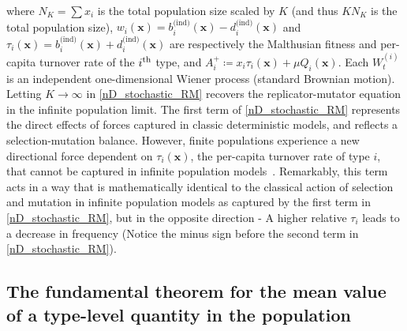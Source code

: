 where $N_K = \sum x_i$ is the total population size scaled by $K$ (and thus $KN_K$ is the total population size), $w_i(\mathbf{x}) = b^{\textrm{(ind)}}_{i}(\mathbf{x}) - d^{\textrm{(ind)}}_{i}(\mathbf{x})$ and $\tau_i(\mathbf{x}) = b^{\textrm{(ind)}}_{i}(\mathbf{x}) + d^{\textrm{(ind)}}_{i}(\mathbf{x})$ are respectively the Malthusian fitness and per-capita turnover rate of the $i\textsuperscript{th}$ type, and $A_i^{+} \coloneqq x_i\tau_i(\mathbf{x}) + \mu Q_i(\mathbf{x})$. Each $W^{(i)}_t$ is an independent one-dimensional Wiener process (standard Brownian motion). Letting $K \to \infty$  in \eqref{nD_stochastic_RM} recovers the replicator-mutator equation in the infinite population limit. The first term of \eqref{nD_stochastic_RM} represents the direct effects of forces captured in classic deterministic models, and reflects a selection-mutation balance. However, finite populations experience a new directional force dependent on $\tau_i(\mathbf{x})$, the per-capita turnover rate of type $i$, that cannot be captured in infinite population models~\citep{kuosmanen_turnover_2022}. Remarkably, this term acts in a way that is mathematically identical to the classical action of selection and mutation in infinite population models as captured by the first term in \eqref{nD_stochastic_RM}, but in the opposite direction - A higher relative $\tau_i$ leads to a decrease in frequency (Notice the minus sign before the second term in \eqref{nD_stochastic_RM}).
\subsection{The fundamental theorem for the mean value of a type-level quantity in the population}\label{sec_fun_theorems_mean}

